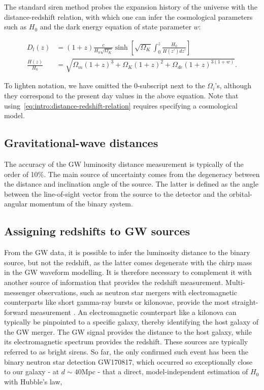 \documentclass[%
 reprint,
 amsmath,amssymb,
 aps,
]{revtex4-2}
\begin{document}
The standard siren method probes the expansion history of the universe with the distance-redshift
relation, with which one can infer the cosmological parameters such as $H_0$ and the dark energy
equation of state parameter $w$:~\cite{Hogg:1999ad}

\begin{align}
	\label{eq:intro:distance-redshift-relation}
	D_l(z)           & = (1+z)\frac{c}{H_0 \sqrt{\Omega_{K}}} \sinh \left[ \sqrt{\Omega_{K}} \int_0^z \frac{H_0}{H(z') dz'}\right] \\
	\nonumber
	\frac{H(z)}{H_0} & = \sqrt{\Omega_m (1+z)^3 + \Omega_K (1+z)^2 + \Omega_{de} (1+z)^{3(1+w)}}.
\end{align}

To lighten notation, we have omitted the 0-subscript next to the $\Omega_i$'s, although they
correspond to the present day values in the above equation. Note that
using~\eqref{eq:intro:distance-redshift-relation} requires specifying a cosmological model.

\subsection{Gravitational-wave distances}

The accuracy of the GW luminosity distance measurement is typically of the order of 10\%. The main
source of uncertainty comes from the degeneracy between the distance and inclination angle of the
source. The latter is defined as the angle between the line-of-sight vector from the source to the
detector and the orbital-angular momentum of the binary system.

\subsection{Assigning redshifts to GW sources}

From the GW data, it is possible to infer the luminosity distance to the binary source, but not the
redshift, as the latter comes degenerate with the chirp mass in the GW waveform modelling. It is
therefore necessary to complement it with another source of information that provides the redshift
measurement. Multi-messenger observations, such as neutron star mergers with electromagnetic
counterparts like short gamma-ray bursts or kilonovae, provide the most straight-forward
measurement \cite{Holz:2005df,Dalal:2006qt}. An electromagnetic counterpart like a kilonova can
typically be pinpointed to a specific galaxy, thereby identifying the host galaxy of the GW merger.
The GW signal provides the distance to the host galaxy, while its electromagnetic spectrum provides
the redshift. These sources are typically referred to as bright sirens. So far, the only confirmed
such event has been the binary neutron star detection GW170817, which occurred so exceptionally
close to our galaxy - at $d \sim 40$Mpc - that a direct, model-independent estimation of $H_0$ with
Hubble's law,
\end{document}
